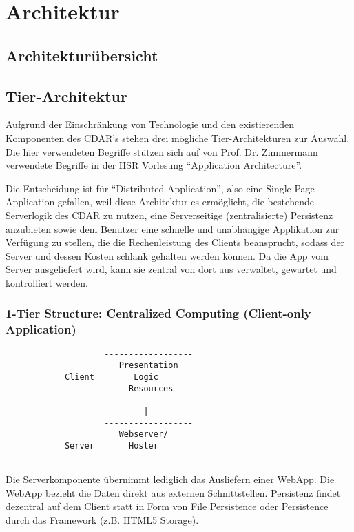 \chapter{Architektur}
	\section{Architekturübersicht}
	
	
	\section{Tier-Architektur}
		Aufgrund der Einschränkung von Technologie und den existierenden Komponenten des CDAR's stehen drei mögliche Tier-Architekturen zur Auswahl.
		Die hier verwendeten Begriffe stützen sich auf von Prof. Dr. Zimmermann verwendete Begriffe in der HSR Vorlesung "`Application Architecture"'\cite{_layers_2014}.
	
		Die Entscheidung ist für "`Distributed Application"', also eine Single Page Application gefallen, 
		weil diese Architektur es ermöglicht, die bestehende Serverlogik des CDAR zu nutzen, 
		eine Serverseitige (zentralisierte) Persistenz anzubieten sowie dem Benutzer eine schnelle und unabhängige Applikation zur Verfügung zu stellen, die die Rechenleistung des Clients beansprucht, sodass der Server und dessen Kosten schlank gehalten werden können.
		Da die App vom Server ausgeliefert wird, kann sie zentral von dort aus verwaltet, gewartet und kontrolliert werden.
		
		\subsection{1-Tier Structure: Centralized Computing (Client-only Application)}
			\begin{verbatim}
			        ------------------
			           Presentation
			Client        Logic
			             Resources
			        ------------------
			                |
			        ------------------
			           Webserver/
			Server       Hoster	
			        ------------------		
			\end{verbatim}

			Die Serverkomponente übernimmt lediglich das Ausliefern einer WebApp. 
			Die WebApp bezieht die Daten direkt aus externen Schnittstellen. 
			Persistenz findet dezentral auf dem Client statt in Form von File Persistence oder 
			Persistence durch das Framework (z.B. HTML5 Storage).
	

